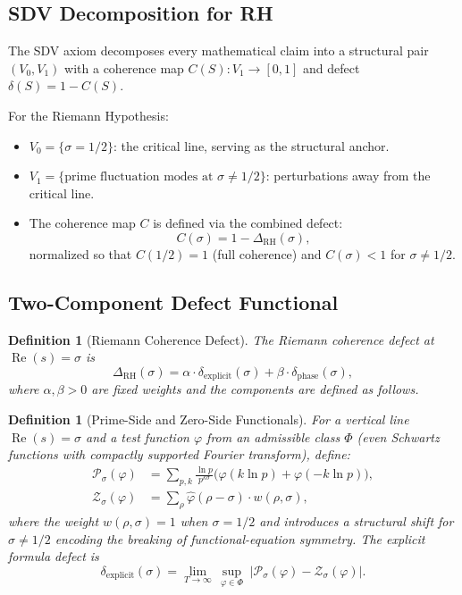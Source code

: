 \documentclass[11pt]{article}
\newtheorem{definition}[theorem]{Definition}
\theoremstyle{remark}
\DeclareMathOperator{\Rea}{Re}
\begin{document}
\subsection{SDV Decomposition for RH}
\label{subsec:sdv}

The SDV axiom decomposes every mathematical claim into a structural pair
$(V_0,V_1)$ with a coherence map $C(S)\colon V_1\to[0,1]$ and defect $\delta(S)=1-C(S)$.

For the Riemann Hypothesis:
\begin{itemize}
  \item $V_0 = \{\sigma=1/2\}$: the critical line, serving as the structural anchor.
  \item $V_1 = \{\text{prime fluctuation modes at } \sigma\neq 1/2\}$: perturbations away
    from the critical line.
  \item The coherence map $C$ is defined via the combined defect:
    \[
      C(\sigma) = 1 - \Delta_{\mathrm{RH}}(\sigma),
    \]
    normalized so that $C(1/2)=1$ (full coherence) and $C(\sigma)<1$ for $\sigma\neq 1/2$.
\end{itemize}

\subsection{Two-Component Defect Functional}
\label{subsec:defect}

\begin{definition}[Riemann Coherence Defect]
\label{def:delta-RH}
The \emph{Riemann coherence defect} at $\Rea(s)=\sigma$ is
\begin{equation}\label{eq:delta-RH}
  \Delta_{\mathrm{RH}}(\sigma) = \alpha\cdot\delta_{\mathrm{explicit}}(\sigma)
  + \beta\cdot\delta_{\mathrm{phase}}(\sigma),
\end{equation}
where $\alpha,\beta>0$ are fixed weights and the components are defined as follows.
\end{definition}

\begin{definition}[Prime-Side and Zero-Side Functionals]
\label{def:functionals}
For a vertical line $\Rea(s)=\sigma$ and a test function $\varphi$ from an admissible
class $\Phi$ (even Schwartz functions with compactly supported Fourier transform), define:
\begin{align}
  \mathcal{P}_\sigma(\varphi) &= \sum_{p,k} \frac{\ln p}{p^{k\sigma}}
    \bigl(\varphi(k\ln p)+\varphi(-k\ln p)\bigr), \label{eq:P-sigma}\\
  \mathcal{Z}_\sigma(\varphi) &= \sum_{\rho} \hat{\varphi}(\rho-\sigma)\cdot w(\rho,\sigma),
    \label{eq:Z-sigma}
\end{align}
where the weight $w(\rho,\sigma)=1$ when $\sigma=1/2$ and introduces a structural shift
for $\sigma\neq 1/2$ encoding the breaking of functional-equation symmetry.
The \emph{explicit formula defect} is
\begin{equation}\label{eq:delta-explicit}
  \delta_{\mathrm{explicit}}(\sigma) = \lim_{T\to\infty}\,
  \sup_{\varphi\in\Phi}\;
  |\mathcal{P}_\sigma(\varphi)-\mathcal{Z}_\sigma(\varphi)|.
\end{equation}
\end{definition}
\end{document}
